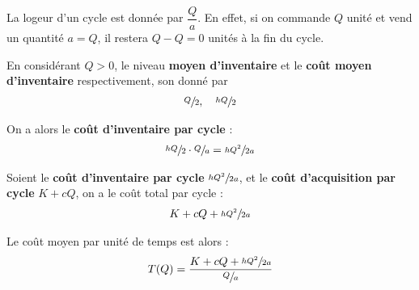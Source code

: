 \documentclass{report}
\begin{document}
\begin{multicols*}{2}
    La logeur d'un cycle est donnée par \( \dfrac{Q}{a} \). En effet, 
    si on commande $Q$ unité et vend un quantité $a = Q$, il restera
    $Q - Q = 0$ unités à la fin du cycle.  

    En considérant \( Q > 0\), le niveau \textbf{moyen d'inventaire } et 
    le \textbf{coût moyen d'inventaire} respectivement, son donné par 
    \begin{align*}
        \sfrac{Q}{2}, \quad \sfrac{hQ}{2}
    \end{align*}

    On a alors le \textcolor{myr}{\textbf{coût d'inventaire par cycle}} :
    \begin{align*}
        \sfrac{hQ}{2} \cdot \sfrac{Q}{a} = \sfrac{hQ^2}{2a}
    \end{align*}

    Soient le \textcolor{myr}{\textbf{coût d'inventaire par cycle }} 
    \( \sfrac{hQ^2}{2a} \), 
    et le  \textcolor{myr}{\textbf{coût d'acquisition par cycle}} 
    \(  K + cQ\), on a le coût total par cycle :
    \begin{align*}
        K + cQ + \sfrac{hQ^2}{2a}
    \end{align*}

    Le coût moyen par unité de temps est alors :
    \begin{align*}
        T(Q) 
        =
        \dfrac{K + cQ + \sfrac{hQ^2}{2a}}{\sfrac{Q}{a}}
    \end{align*}


\end{multicols*}
\end{document}
